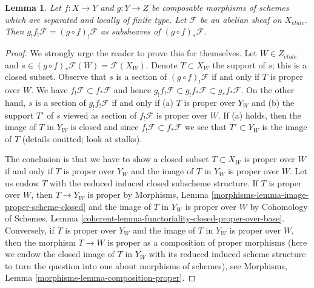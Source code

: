 \documentclass{stacks-project}
\theoremstyle{plain}
\newtheorem{lemma}[subsection]{Lemma}
\theoremstyle{definition}
\theoremstyle{remark}
\numberwithin{equation}{subsection}
\def\etale{{\acute{e}tale}}
\begin{document}
\begin{lemma}
\label{lemma-f-shriek-composition}
Let $f : X \to Y$ and $g : Y \to Z$ be composable morphisms of schemes which
are separated and locally of finite type. Let $\mathcal{F}$ be an abelian
sheaf on $X_\etale$. Then $g_!f_!\mathcal{F} = (g \circ f)_!\mathcal{F}$
as subsheaves of $(g \circ f)_*\mathcal{F}$.
\end{lemma}

\begin{proof}
We strongly urge the reader to prove this for themselves.
Let $W \in Z_\etale$ and
$s \in (g \circ f)_*\mathcal{F}(W) = \mathcal{F}(X_W)$.
Denote $T \subset X_W$ the support of $s$; this is a closed
subset. Observe that $s$ is a section of $(g \circ f)_!\mathcal{F}$
if and only if $T$ is proper over $W$. We have
$f_!\mathcal{F} \subset f_*\mathcal{F}$ and hence
$g_!f_!\mathcal{F} \subset g_!f_*\mathcal{F} \subset g_*f_*\mathcal{F}$.
On the other hand, $s$ is a section of $g_!f_!\mathcal{F}$ if and only
if (a) $T$ is proper over $Y_W$ and (b) the support $T'$ of $s$
viewed as section of $f_!\mathcal{F}$ is proper over $W$.
If (a) holds, then the image of $T$ in $Y_W$ is closed and since
$f_!\mathcal{F} \subset f_*\mathcal{F}$ we see that
$T' \subset Y_W$ is the image of $T$ (details omitted; look at stalks).

\medskip\noindent
The conclusion is that we have to show a closed subset $T \subset X_W$
is proper over $W$ if and only if $T$ is proper over $Y_W$
and the image of $T$ in $Y_W$ is proper over $W$. Let us endow $T$
with the reduced induced closed subscheme structure.
If $T$ is proper over $W$, then $T \to Y_W$ is proper by
Morphisms, Lemma \ref{morphisms-lemma-image-proper-scheme-closed}
and the image of $T$ in $Y_W$ is proper over $W$ by
Cohomology of Schemes, Lemma
\ref{coherent-lemma-functoriality-closed-proper-over-base}.
Conversely, if $T$ is proper over $Y_W$
and the image of $T$ in $Y_W$ is proper over $W$,
then the morphism $T \to W$ is proper as a composition
of proper morphisms (here we endow the closed image of $T$
in $Y_W$ with its reduced induced scheme structure to turn the
question into one about morphisms of schemes), see
Morphisms, Lemma \ref{morphisms-lemma-composition-proper}.
\end{proof}
\end{document}
